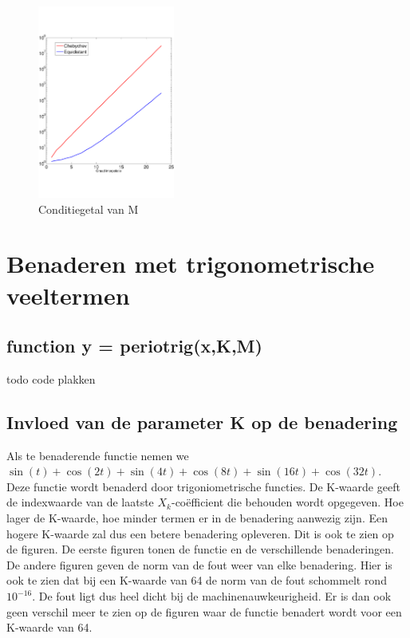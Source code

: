 \documentclass[a4paper, 12pt, titlepage]{report}
\begin{document}
 \begin{center}
 \begin{figure}[!hb]
 \centering
  	\includegraphics[width=0.4\textwidth]{condition.pdf}
  	\caption{Conditiegetal van M}
  	\label{condition}
  \end{figure}
 \end{center}
 
\section{Benaderen met trigonometrische veeltermen}
\subsection{function y = periotrig(x,K,M)}
todo code plakken
\subsection{Invloed van de parameter K op de benadering}
Als te benaderende functie nemen we $\sin(t) + \cos(2t) + \sin(4t) + \cos(8t) + \sin(16t) + \cos(32t)$. Deze functie wordt benaderd door trigoniometrische functies. De K-waarde geeft de indexwaarde van de laatste $X_k$-co\"efficient die behouden wordt opgegeven. Hoe lager de K-waarde, hoe minder termen er in de benadering aanwezig zijn. Een hogere K-waarde zal dus een betere benadering opleveren. Dit is ook te zien op de figuren. De eerste figuren tonen de functie en de verschillende benaderingen. De andere figuren geven de norm van de fout weer van elke benadering. Hier is ook te zien dat bij een K-waarde van 64 de norm van de fout schommelt rond $10^{-16}$. De fout ligt dus heel dicht bij de machinenauwkeurigheid. Er is dan ook geen verschil meer te zien op de figuren waar de functie benadert wordt voor een K-waarde van 64.
\end{document}
